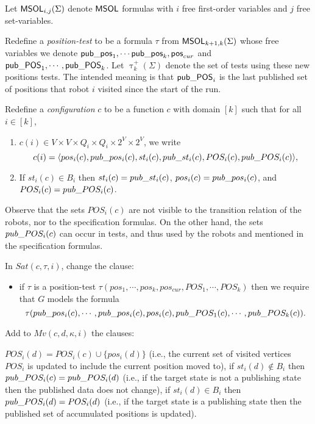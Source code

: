  Let $\mathsf{MSOL}_{i,j}(\Sigma)$ denote $\mathsf{MSOL}$ formulas with $i$ free first-order variables and $j$ free set-variables.

Redefine a {\em position-test} to be a formula $\tau$ from $\mathsf{MSOL}_{k+1,k}(\Sigma)$ whose free variables we denote
$\mathsf{pub\_pos}_1, \cdots \mathsf{pub\_pos}_k,\mathsf{pos}_{cur}$ and $\mathsf{pub\_POS}_1, \cdots, \mathsf{pub\_POS}_k$.
Let $\uptau^+_k(\Sigma)$ denote the set of tests using these new positions tests.
The intended meaning is that $\mathsf{pub\_POS}_i$ is the last published set of positions that robot $i$ visited since the start of the run.

Redefine a {\em configuration} $c$ to be a function $c$ with domain $[k]$ such that for all $i \in [k]$,
\begin{enumerate}
 \item $c(i) \in V \times V \times Q_i \times Q_i \times 2^V \times 2^V$, we write
 \[
c(i) =  \langle {pos_i(c), pub\_pos_i(c), st_i(c), pub\_st_i(c), POS_i(c),pub\_POS_i(c)} \rangle,
 \]
 \item If $st_i(c) \in B_i$ then $st_i(c) = pub\_st_i(c)$, $pos_i(c) = pub\_pos_i(c)$, and $POS_i(c) = pub\_POS_i(c)$.
\end{enumerate}

Observe that the sets $POS_i(c)$ are not visible to the transition relation of the robots, nor to the specification formulas.
On the other hand, the sets $pub\_POS_i(c)$ can occur in tests, and thus used by the robots and mentioned in the specification formulas.


 In $Sat(c,\tau,i)$, change the clause:
\begin{itemize}
\item if $\tau$ is a position-test $\tau(pos_1, \cdots, pos_k,pos_{cur},POS_1, \cdots, POS_k)$ then we require that $G$ models the formula
\[\tau(pub\_pos_i(c), \cdots, pub\_pos_i(c),pos_i(c),pub\_POS_1(c), \cdots, pub\_POS_k(c)).
\]
\end{itemize}

 Add to $Mv(c,d,\kappa,i)$ the clauses:
\begin{itemize}
 \- $POS_i(d) = POS_i(c) \cup \{pos_i(d)\}$ (i.e., the current set of visited vertices $POS_i$ is updated to include the current position moved to),
 \- if $st_i(d) \not \in B_i$ then $pub\_POS_i(c) = pub\_POS_i(d)$  (i.e., if the target state is not a publishing state then the published data does not change),
 \- if $st_i(d) \in B_i$ then $pub\_POS_i(d) = POS_i(d)$ (i.e., if the target state is a publishing state then the published set of accumulated positions is updated).
\end{itemize}

